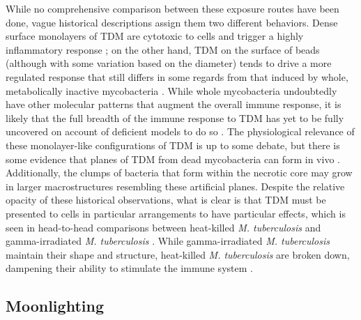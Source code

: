 While no comprehensive comparison between these exposure routes have been done, vague historical descriptions assign them two different behaviors. Dense surface monolayers of TDM are cytotoxic to cells and trigger a highly inflammatory response \citep{Retzinger1982, Schabbing1994, Hunter2006}; on the other hand, TDM on the surface of beads (although with some variation based on the diameter) tends to drive a more regulated response that still differs in some regards from that induced by whole, metabolically inactive mycobacteria \citep{Bowdish2009}. While whole mycobacteria undoubtedly have other molecular patterns that augment the overall immune response, it is likely that the full breadth of the immune response to TDM has yet to be fully uncovered on account of deficient models to do so \citep{Some model of total lipid reconstitution on bacillus-sized beads may get us closer to this -- isolating lipid activity in a native context but in the absence of confounding bacterial physiology.}. The physiological relevance of these monolayer-like configurations of TDM is up to some debate, but there is some evidence that planes of TDM from dead mycobacteria can form in vivo \citep{Hunter2006, Glickman2008 Schabbing1994}. Additionally, the clumps of bacteria that form within the necrotic core may grow in larger macrostructures resembling these artificial planes. Despite the relative opacity of these historical observations, what is clear is that TDM must be presented to cells in particular arrangements to have particular effects, which is seen in head-to-head comparisons between heat-killed \textit{M. tuberculosis} and gamma-irradiated \textit{M. tuberculosis} \citep{Mosavari2020, Cha2015, Yang2018, Gleeson2016, Datta2006}. While gamma-irradiated \textit{M. tuberculosis} maintain their shape and structure, heat-killed \textit{M. tuberculosis} are broken down, dampening their ability to stimulate the immune system \citep{SecanellaFandos2014}. 

\subsection{Moonlighting}\label{moon}

